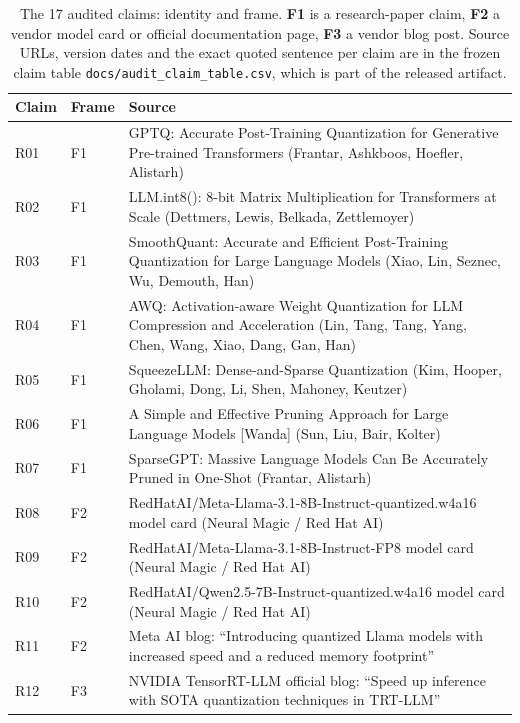 \begin{table}[!t]
\centering
\scriptsize
\caption{The 17 audited claims: identity and frame. \textbf{F1} is a research-paper claim, \textbf{F2} a vendor model card or official documentation page, \textbf{F3} a vendor blog post. Source URLs, version dates and the exact quoted sentence per claim are in the frozen claim table \texttt{docs/audit\_claim\_table.csv}, which is part of the released artifact.}
\label{tab:audit-identity}
\begin{tabular}{@{}llp{10.2cm}@{}}
\toprule
Claim & Frame & Source \\
\midrule
R01 & F1 & GPTQ: Accurate Post-Training Quantization for Generative Pre-trained Transformers (Frantar, Ashkboos, Hoefler, Alistarh) \\
R02 & F1 & LLM.int8(): 8-bit Matrix Multiplication for Transformers at Scale (Dettmers, Lewis, Belkada, Zettlemoyer) \\
R03 & F1 & SmoothQuant: Accurate and Efficient Post-Training Quantization for Large Language Models (Xiao, Lin, Seznec, Wu, Demouth, Han) \\
R04 & F1 & AWQ: Activation-aware Weight Quantization for LLM Compression and Acceleration (Lin, Tang, Tang, Yang, Chen, Wang, Xiao, Dang, Gan, Han) \\
R05 & F1 & SqueezeLLM: Dense-and-Sparse Quantization (Kim, Hooper, Gholami, Dong, Li, Shen, Mahoney, Keutzer) \\
R06 & F1 & A Simple and Effective Pruning Approach for Large Language Models [Wanda] (Sun, Liu, Bair, Kolter) \\
R07 & F1 & SparseGPT: Massive Language Models Can Be Accurately Pruned in One-Shot (Frantar, Alistarh) \\
R08 & F2 & RedHatAI/Meta-Llama-3.1-8B-Instruct-quantized.w4a16 model card (Neural Magic / Red Hat AI) \\
R09 & F2 & RedHatAI/Meta-Llama-3.1-8B-Instruct-FP8 model card (Neural Magic / Red Hat AI) \\
R10 & F2 & RedHatAI/Qwen2.5-7B-Instruct-quantized.w4a16 model card (Neural Magic / Red Hat AI) \\
R11 & F2 & Meta AI blog: ``Introducing quantized Llama models with increased speed and a reduced memory footprint'' \\
R12 & F3 & NVIDIA TensorRT-LLM official blog: ``Speed up inference with SOTA quantization techniques in TRT-LLM'' \\

\end{tabular}
\end{table}
